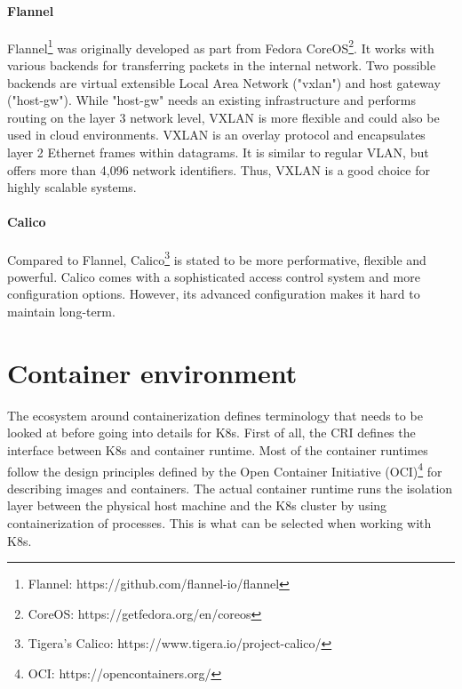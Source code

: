 \paragraph*{Flannel}
Flannel\footnote{Flannel: https://github.com/flannel-io/flannel} was originally developed as part from Fedora CoreOS\footnote{CoreOS: https://getfedora.org/en/coreos}\cite{SuseRancherCommunity.20230212}. It works with various backends for transferring packets in the internal network. Two possible backends are virtual extensible Local Area Network ("vxlan") and host gateway ("host-gw"). While "host-gw" needs an existing infrastructure and performs routing on the layer 3 network level, VXLAN is more flexible and could also be used in cloud environments\cite{GitHubFlannel.io.20230212}. VXLAN is an overlay protocol and encapsulates layer 2 Ethernet frames within datagrams\cite{SuseRancherCommunity.20230212}. It is similar to regular VLAN, but offers more than 4,096 network identifiers\cite{SuseRancherCommunity.20230212}. Thus, VXLAN is a good choice for highly scalable systems.

\paragraph*{Calico}
Compared to Flannel, Calico\footnote{Tigera's Calico: https://www.tigera.io/project-calico/} is stated to be more performative, flexible and powerful\cite{SuseRancherCommunity.20230212,Tigera.20230210}. Calico comes with a sophisticated access control system\cite{Tigera.20230210} and more configuration options. However, its advanced configuration makes it hard to maintain long-term.



\section{Container environment}
The ecosystem around containerization defines terminology that needs to be looked at before going into details for \ac{K8s}. First of all, the \acf{CRI} defines the interface between \ac{K8s} and container runtime. Most of the container runtimes follow the design principles defined by the Open Container Initiative (OCI)\footnote{OCI: https://opencontainers.org/} for describing images and containers. The actual container runtime runs the isolation layer between the physical host machine and the \ac{K8s} cluster by using containerization of processes. This is what can be selected when working with \ac{K8s}.

